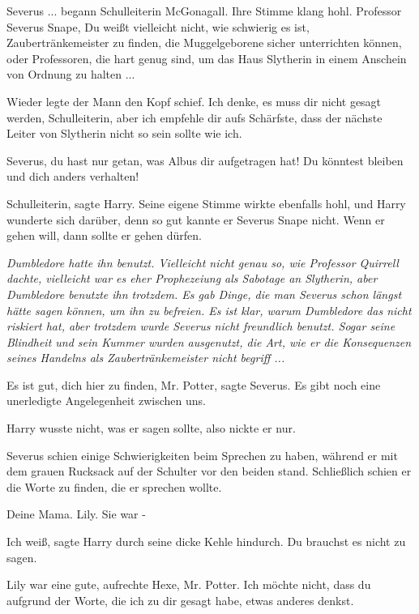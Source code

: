 \glqq{}Severus ...\grqq{} begann Schulleiterin McGonagall. Ihre Stimme klang hohl.
\glqq{}Professor Severus Snape, Du weißt vielleicht nicht, wie schwierig es ist,
Zaubertränkemeister zu finden, die Muggelgeborene sicher unterrichten können,
oder Professoren, die hart genug sind, um das Haus Slytherin in einem Anschein
von Ordnung zu halten ...\grqq{}

Wieder legte der Mann den Kopf schief. \glqq{}Ich denke, es muss dir nicht gesagt
werden, Schulleiterin, aber ich empfehle dir aufs Schärfste, dass der nächste
Leiter von Slytherin nicht so sein sollte wie ich.\grqq{}

\glqq{}Severus, du hast nur getan, was Albus dir aufgetragen hat! Du könntest
bleiben und dich anders verhalten!\grqq{}

\glqq{}Schulleiterin\grqq{}, sagte Harry. Seine eigene Stimme wirkte ebenfalls
hohl, und Harry wunderte sich darüber, denn so gut kannte er Severus Snape
nicht. \glqq{}Wenn er gehen will, dann sollte er gehen dürfen.\grqq{}

\emph{Dumbledore hatte ihn benutzt. Vielleicht nicht genau so, wie Professor
Quirrell dachte, vielleicht war es eher Prophezeiung als Sabotage an Slytherin,
aber Dumbledore benutzte ihn trotzdem. Es gab Dinge, die man Severus schon
längst hätte sagen können, um ihn zu befreien. Es ist klar, warum Dumbledore das
nicht riskiert hat, aber trotzdem wurde Severus nicht freundlich benutzt. Sogar
seine Blindheit und sein Kummer wurden ausgenutzt, die Art, wie er die
Konsequenzen seines Handelns als Zaubertränkemeister nicht begriff ...}

\glqq{}Es ist gut, dich hier zu finden, Mr. Potter\grqq{}, sagte Severus. \glqq{}
Es gibt noch eine unerledigte Angelegenheit zwischen uns.\grqq{}

Harry wusste nicht, was er sagen sollte, also nickte er nur.

Severus schien einige Schwierigkeiten beim Sprechen zu haben, während er mit dem
grauen Rucksack auf der Schulter vor den beiden stand. Schließlich schien er die
Worte zu finden, die er sprechen wollte.

\glqq{}Deine Mama. Lily. Sie war -\grqq{}

\glqq{}Ich weiß\grqq{}, sagte Harry durch seine dicke Kehle hindurch. \glqq{}Du
brauchst es nicht zu sagen.\grqq{}

\glqq{}Lily war eine gute, aufrechte Hexe, Mr. Potter. Ich möchte nicht, dass du
aufgrund der Worte, die ich zu dir gesagt habe, etwas anderes denkst.\grqq{}

